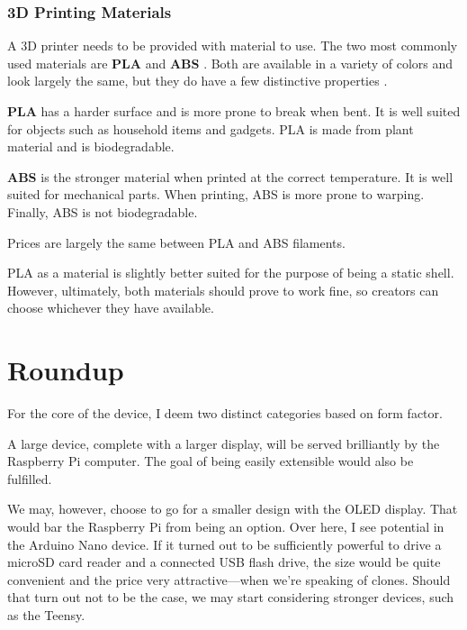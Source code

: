             \subsubsection{3D Printing Materials}
                A 3D printer needs to be provided with material to use.  The two most commonly used materials are \textbf{PLA} and \textbf{ABS} \cite{all3dp-best-fileament-types}.  Both are available in a variety of colors and look largely the same, but they do have a few distinctive properties \cite{all3dp-pla-abs}. 
                
                \textbf{PLA} has a harder surface and is more prone to break when bent.  It is well suited for objects such as household items and gadgets.  PLA is made from plant material and is biodegradable.
                
                \textbf{ABS} is the stronger material when printed at the correct temperature.  It is well suited for mechanical parts.  When printing, ABS is more prone to warping.  Finally, ABS is not biodegradable.
                
                Prices are largely the same between PLA and ABS filaments.
                
                PLA as a material is slightly better suited for the purpose of being a static shell.  However, ultimately, both materials should prove to work fine, so creators can choose whichever they have available.
                
    \section{Roundup}
        For the core of the device, I deem two distinct categories based on form factor.
        
        A large device, complete with a larger display, will be served brilliantly by the Raspberry Pi computer.  The goal of being easily extensible would also be fulfilled.
        
        We may, however, choose to go for a smaller design with the OLED display.  That would bar the Raspberry Pi from being an option.  Over here, I see potential in the Arduino Nano device.  If it turned out to be sufficiently powerful to drive a microSD card reader and a connected USB flash drive, the size would be quite convenient and the price very attractive—when we're speaking of clones.  Should that turn out not to be the case, we may start considering stronger devices, such as the Teensy.
        
